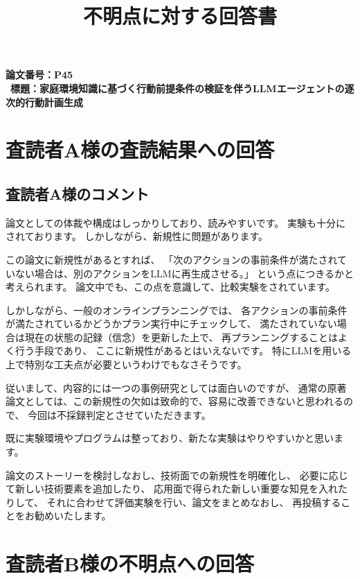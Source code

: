 \documentclass{jsarticle}
\title{不明点に対する回答書}
\author{\empty}
\date{\empty}
\begin{document}
\maketitle
\noindent \textbf{論文番号：P45} \\\
\noindent \textbf{標題：家庭環境知識に基づく行動前提条件の検証を伴うLLMエージェントの逐次的行動計画生成}  \\



\newpage

\section*{査読者A様の査読結果への回答}

\subsection*{査読者A様のコメント}
\begin{screen}
論文としての体裁や構成はしっかりしており、読みやすいです。
実験も十分にされております。
しかしながら、新規性に問題があります。

この論文に新規性があるとすれば、
「次のアクションの事前条件が満たされていない場合は、別のアクションをLLMに再生成させる。」
という点につきるかと考えられます。
論文中でも、この点を意識して、比較実験をされています。

しかしながら、一般のオンラインプランニングでは、
各アクションの事前条件が満たされているかどうかプラン実行中にチェックして、
満たされていない場合は現在の状態の記録（信念）を更新した上で、
再プランニングすることはよく行う手段であり、
ここに新規性があるとはいえないです。
特にLLMを用いる上で特別な工夫点が必要というわけでもなさそうです。

従いまして、内容的には一つの事例研究としては面白いのですが、
通常の原著論文としては、この新規性の欠如は致命的で、容易に改善できないと思われるので、
今回は不採録判定とさせていただきます。

既に実験環境やプログラムは整っており、新たな実験はやりやすいかと思います。

論文のストーリーを検討しなおし、技術面での新規性を明確化し、
必要に応じて新しい技術要素を追加したり、
応用面で得られた新しい重要な知見を入れたりして、
それに合わせて評価実験を行い、論文をまとめなおし、
再投稿することをお勧めいたします。
\end{screen}

\newpage

\section*{査読者B様の不明点への回答}
\end{document}
